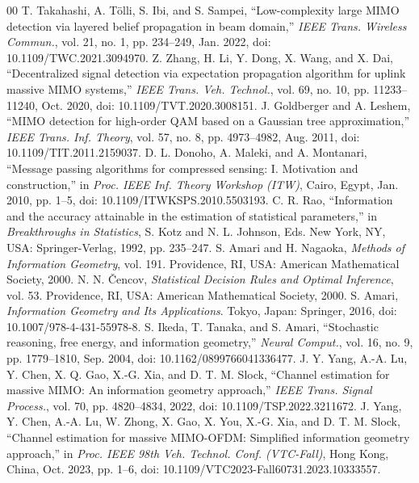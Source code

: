 \documentclass[conference]{IEEEtran}
\begin{document}
\begin{thebibliography}{00}
		 T. Takahashi, A. T\"olli, S. Ibi, and S. Sampei, ``Low-complexity large MIMO detection via layered belief propagation in beam domain,'' \textit{IEEE Trans. Wireless Commun.}, vol. 21, no. 1, pp. 234--249, Jan. 2022, doi: 10.1109/TWC.2021.3094970.
		 Z. Zhang, H. Li, Y. Dong, X. Wang, and X. Dai, ``Decentralized signal detection via expectation propagation algorithm for uplink massive MIMO systems,'' \textit{IEEE Trans. Veh. Technol.}, vol. 69, no. 10, pp. 11233--11240, Oct. 2020, doi: 10.1109/TVT.2020.3008151.
		 J. Goldberger and A. Leshem, ``MIMO detection for high-order QAM based on a Gaussian tree approximation,'' \textit{IEEE Trans. Inf. Theory}, vol. 57, no. 8, pp. 4973--4982, Aug. 2011, doi: 10.1109/TIT.2011.2159037.
		 D. L. Donoho, A. Maleki, and A. Montanari, ``Message passing algorithms for compressed sensing: I. Motivation and construction,'' in \textit{Proc. IEEE Inf. Theory Workshop (ITW)}, Cairo, Egypt, Jan. 2010, pp. 1--5, doi: 10.1109/ITWKSPS.2010.5503193.
		 C. R. Rao, ``Information and the accuracy attainable in the estimation of statistical parameters,'' in \textit{Breakthroughs in Statistics}, S. Kotz and N. L. Johnson, Eds. New York, NY, USA: Springer-Verlag, 1992, pp. 235--247.
		 S. Amari and H. Nagaoka, \textit{Methods of Information Geometry}, vol. 191. Providence, RI, USA: American Mathematical Society, 2000.
		 N. N. \v{C}encov, \textit{Statistical Decision Rules and Optimal Inference}, vol. 53. Providence, RI, USA: American Mathematical Society, 2000.
		 S. Amari, \textit{Information Geometry and Its Applications}. Tokyo, Japan: Springer, 2016, doi: 10.1007/978-4-431-55978-8.
		 S. Ikeda, T. Tanaka, and S. Amari, ``Stochastic reasoning, free energy, and information geometry,'' \textit{Neural Comput.}, vol. 16, no. 9, pp. 1779--1810, Sep. 2004, doi: 10.1162/0899766041336477.
		 J. Y. Yang, A.-A. Lu, Y. Chen, X. Q. Gao, X.-G. Xia, and D. T. M. Slock, ``Channel estimation for massive MIMO: An information geometry approach,'' \textit{IEEE Trans. Signal Process.}, vol. 70, pp. 4820--4834, 2022, doi: 10.1109/TSP.2022.3211672.
		 J. Yang, Y. Chen, A.-A. Lu, W. Zhong, X. Gao, X. You, X.-G. Xia, and D. T. M. Slock, ``Channel estimation for massive MIMO-OFDM: Simplified information geometry approach,'' in \textit{Proc. IEEE 98th Veh. Technol. Conf. (VTC-Fall)}, Hong Kong, China, Oct. 2023, pp. 1--6, doi: 10.1109/VTC2023-Fall60731.2023.10333557.
	\end{thebibliography}
	
\end{document}
